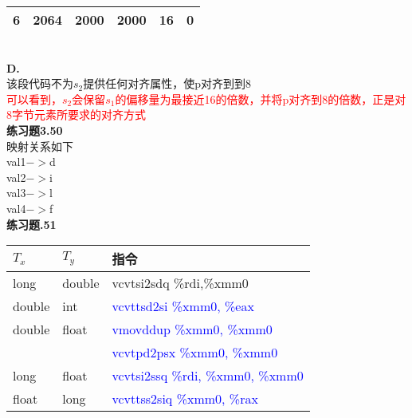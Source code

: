 \documentclass{article}
\newcommand{\blue}[1]{\textcolor{blue}{#1}}
\newcommand{\red}[1]{\textcolor{red}{#1}}
\begin{document}
\begin{CJK}{UTF8}{uyhei}
\begin{table}[htbp]
\begin{tabular}{|m{6em}<{\centering}m{6em}<{\centering}m{6em}<{\centering}m{6em}<{\centering}m{6em}<{\centering}m{6em}<{\centering}|}
6	&	2064	&	2000	&	2000	&	16	&	0	\\
\hline
\end{tabular}
\end{table}	\\[2ex]
\textbf{D.}	\\
该段代码不为$s_2$提供任何对齐属性，使p对齐到到8	\\
\red{可以看到，$s_2$会保留$s_1$的偏移量为最接近16的倍数，并将p对齐到8的倍数，正是对8字节元素所要求的对齐方式}	\\[3ex]
\textbf{练习题3.50}	\\
映射关系如下	\\
val1$->$d	\\
val2$->$i	\\
val3$->$l	\\
val4$->$f	\\[3ex]
\newpage
\noindent\textbf{练习题.51}	\\
\renewcommand\arraystretch{1.4}
\begin{table}[htbp]
\centering
\begin{tabular}{|m{6em}<{\centering}|m{6em}<{\centering}|m{16em}<{\centering}|}
\hline
$T_x$	&	$T_y$	&	指令	\\
\hline
long	&	double	&	vcvtsi2sdq \%rdi,\%xmm0	\\
\hline
double	&	int	&	\blue{vcvttsd2si \%xmm0, \%eax}	\\
\hline
double	&	float	&	\blue{vmovddup \%xmm0, \%xmm0}	\\
	&		&	\blue{vcvtpd2psx \%xmm0, \%xmm0}	\\
\hline
long	&	float	&	\blue{vcvtsi2ssq \%rdi, \%xmm0, \%xmm0}	\\
\hline
float	&	long	&	\blue{vcvttss2siq \%xmm0, \%rax}	\\
\hline
\end{tabular}
\end{table}	\\[2ex]







\end{CJK}
\end{document}
